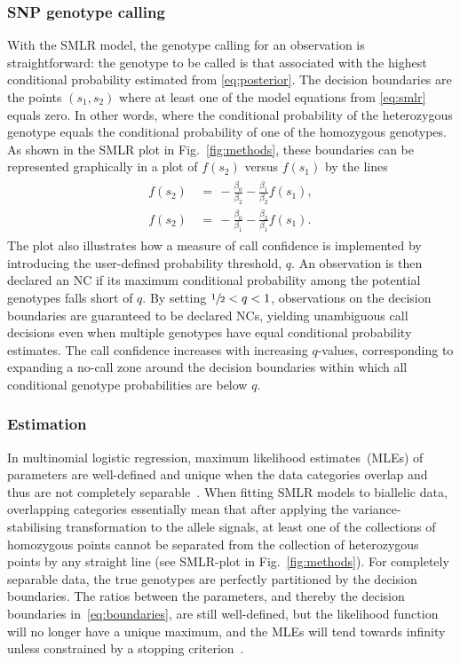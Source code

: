 \documentclass[preprint,5p,times,11pt]{elsarticle}
\begin{document}
\subsubsection{SNP genotype calling}
With the SMLR model, the genotype calling for an observation is straightforward: the genotype to be called is that associated with the highest conditional probability estimated from \eqref{eq:posterior}.
The decision boundaries are the points $(s_1, s_2)$ where at least one of the model equations from \eqref{eq:smlr} equals zero.
In other words, where the conditional probability of the heterozygous genotype equals the conditional probability of one of the homozygous genotypes.
As shown in the SMLR plot in Fig.~\ref{fig:methods}, these boundaries can be represented graphically in a plot of $f(s_2)$ versus $f(s_1)$ by the lines
\begin{align}\label{eq:boundaries}
\begin{split}
f(s_2) \, &= \, -\frac{\beta_0}{\beta_2} - \frac{\beta_1}{\beta_2} f(s_1), \\
f(s_2) \, &= \, -\frac{\beta_0}{\beta_1} - \frac{\beta_2}{\beta_1} f(s_1).
\end{split}
\end{align}
The plot also illustrates how a measure of call confidence is implemented by introducing the user-defined probability threshold, $q$.
An observation is then declared an NC if its maximum conditional probability among the potential genotypes falls short of $q$.
By setting $\sfrac{1}{2} < q < 1$, observations on the decision boundaries are guaranteed to be declared NCs, yielding unambiguous call decisions even when multiple genotypes have equal conditional probability estimates.
The call confidence increases with increasing $q$-values, corresponding to expanding a no-call zone around the decision boundaries within which all conditional genotype probabilities are below $q$.


\subsubsection{Estimation}
In multinomial logistic regression, maximum likelihood estimates~(MLEs) of parameters are well-defined and unique when the data categories overlap and thus are not completely separable~\cite{albert, lesaffre}.
When fitting SMLR models to biallelic data, overlapping categories essentially mean that after applying the variance-stabilising transformation to the allele signals, at least one of the collections of homozygous points cannot be separated from the collection of heterozygous points by any straight line (see SMLR-plot in Fig.~\ref{fig:methods}).
For completely separable data, the true genotypes are perfectly partitioned by the decision boundaries.
The ratios between the parameters, and thereby the decision boundaries in~\eqref{eq:boundaries}, are still well-defined, but the likelihood function will no longer have a unique maximum, and the MLEs will tend towards infinity unless constrained by a stopping criterion~\cite[p.~298]{agresti}.
\end{document}
